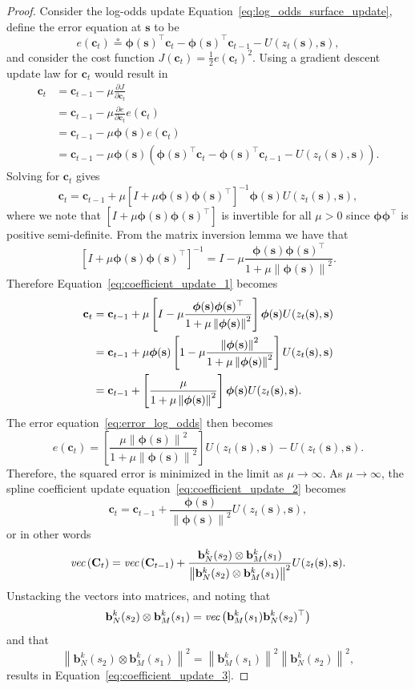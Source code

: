 \documentclass{article}
\newcommand{\norm}[1]{\left\|{#1}\right\|}
\newcommand{\defeq}{\circeq}
\renewcommand{\vec}[1]{\text{\em vec}\left(#1\right)}
\newcommand{\bbf}{\mathbf{b}}
\newcommand{\cbf}{\mathbf{c}}
\newcommand{\sbf}{\mathbf{s}}
\newcommand{\Cbf}{\mathbf{C}}
\newcommand{\phibf}{\boldsymbol{\phi}}
\begin{document}
\begin{proof}
Consider the log-odds update Equation~\eqref{eq:log_odds_surface_update}, define the error equation at $\sbf$ to be
\begin{equation}\label{eq:error_log_odds}
e(\cbf_t) \defeq \phibf(\sbf)^\top \cbf_t - \phibf(\sbf)^\top \cbf_{t-1} - U(z_t(\sbf), \sbf),
\end{equation}
and consider the cost function $J(\cbf_t)=\frac{1}{2}e(\cbf_t)^2$.  Using a gradient descent update law for $\cbf_t$ would result in
\begin{align*}
\cbf_t &= \cbf_{t-1} - \mu \frac{\partial J}{\partial\cbf_t} \\
       &= \cbf_{t-1} - \mu \frac{\partial e}{\partial\cbf_t} e(\cbf_t) \\
	   &= \cbf_{t-1} - \mu \phibf(\sbf) e(\cbf_t) \\
	   &= \cbf_{t-1} - \mu \phibf(\sbf) \left(\phibf(\sbf)^\top \cbf_t - \phibf(\sbf)^\top \cbf_{t-1} - U(z_t(\sbf), \sbf)\right).
\end{align*}
Solving for $\cbf_t$ gives 
\begin{equation}\label{eq:coefficient_update_1}
\cbf_t = \cbf_{t-1} + \mu \left[I + \mu \phibf(\sbf)\phibf(\sbf)^\top\right]^{-1}\phibf(\sbf) U(z_t(\sbf), \sbf),
\end{equation}
where we note that $\left[I + \mu \phibf(\sbf)\phibf(\sbf)^\top\right]$ is invertible for all $\mu>0$ since $\phibf\phibf^\top$ is positive semi-definite.  From the matrix inversion lemma we have that
\[
\left[I + \mu \phibf(\sbf)\phibf(\sbf)^\top\right]^{-1} = I - \mu\frac{\phibf(\sbf)\phibf(\sbf)^\top}{1+\mu\norm{\phibf(\sbf)}^2}.
\]
Therefore Equation~\eqref{eq:coefficient_update_1} becomes
\begin{align}
	\cbf_t &= \cbf_{t-1} + \mu \left[I - \mu\frac{\phibf(\sbf)\phibf(\sbf)^\top}{1+\mu\norm{\phibf(\sbf)}^2}\right]\phibf(\sbf)		   U(z_t(\sbf), \sbf) \notag \\
	       &= \cbf_{t-1} + \mu \phibf(\sbf)\left[1 - \mu\frac{\norm{\phibf(\sbf)}^2}{1+\mu\norm{\phibf(\sbf)}^2}\right]U(z_t(\sbf), \sbf) \notag \\
	       &= \cbf_{t-1} + \left[\frac{\mu}{1+\mu\norm{\phibf(\sbf)}^2}\right]\phibf(\sbf) U(z_t(\sbf), \sbf).
	       \label{eq:coefficient_update_2}
\end{align}
The error equation~\eqref{eq:error_log_odds} then becomes
\[
e(\cbf_t) = \left[\frac{\mu\norm{\phibf(\sbf)}^2}{1+\mu\norm{\phibf(\sbf)}^2}\right] U(z_t(\sbf), \sbf) - U(z_t(\sbf), \sbf).
\]
Therefore, the squared error is minimized in the limit as $\mu\to\infty$.  As $\mu\to\infty$, the spline coefficient update equation~\eqref{eq:coefficient_update_2} becomes
\[
\cbf_t = \cbf_{t-1} + \frac{\phibf(\sbf)}{\norm{\phibf(\sbf)}^2} U(z_t(\sbf), \sbf),
\]
or in other words
\[
\vec{\Cbf_t} = \vec{\Cbf_{t-1}} + \frac{\bbf_N^k(s_2) \otimes \bbf_M^k(s_1)}{\norm{\bbf_N^k(s_2) \otimes \bbf_M^k(s_1)}^2} U(z_t(\sbf), \sbf).
\]
Unstacking the vectors into matrices, and noting that 
\[
\bbf_N^k(s_2) \otimes \bbf_M^k(s_1)=\vec{\bbf_M^k(s_1)\bbf_N^k(s_2)^\top}
\]
and that 
\[
\norm{\bbf_N^k(s_2) \otimes \bbf_M^k(s_1)}^2=\norm{\bbf_M^k(s_1)}^2 \norm{\bbf_N^k(s_2)}^2,
\] 
results in Equation~\eqref{eq:coefficient_update_3}.
\end{proof}
\end{document}
